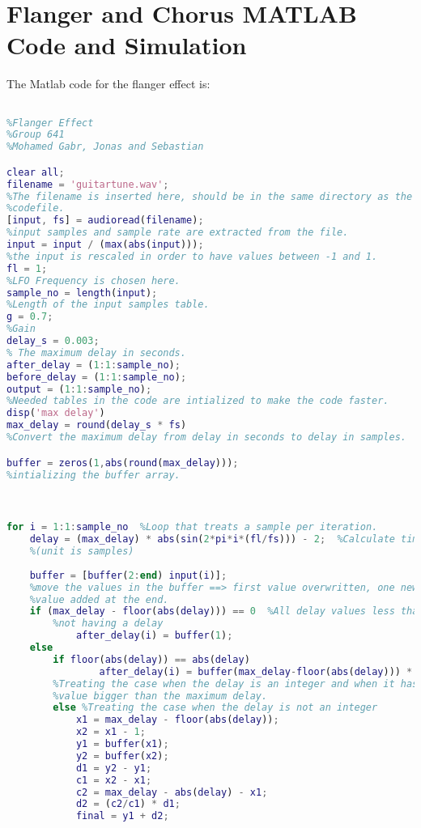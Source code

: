 \chapter{Flanger and Chorus MATLAB Code and Simulation}

The Matlab code for the flanger effect is:

\begin{lstlisting}[language=Matlab, caption= Matlab code for flanger effect]

%Flanger Effect
%Group 641
%Mohamed Gabr, Jonas and Sebastian

clear all;
filename = 'guitartune.wav'; 
%The filename is inserted here, should be in the same directory as the
%codefile.
[input, fs] = audioread(filename);
%input samples and sample rate are extracted from the file.
input = input / (max(abs(input)));
%the input is rescaled in order to have values between -1 and 1. 
fl = 1;  
%LFO Frequency is chosen here.
sample_no = length(input); 
%Length of the input samples table.
g = 0.7; 
%Gain
delay_s = 0.003; 
% The maximum delay in seconds.
after_delay = (1:1:sample_no); 
before_delay = (1:1:sample_no);
output = (1:1:sample_no);
%Needed tables in the code are intialized to make the code faster.
disp('max delay')
max_delay = round(delay_s * fs)  
%Convert the maximum delay from delay in seconds to delay in samples.

buffer = zeros(1,abs(round(max_delay))); 
%intializing the buffer array.



for i = 1:1:sample_no  %Loop that treats a sample per iteration. 
	delay = (max_delay) * abs(sin(2*pi*i*(fl/fs))) - 2;  %Calculate time varying delay 
	%(unit is samples)
	
	buffer = [buffer(2:end) input(i)]; 
	%move the values in the buffer ==> first value overwritten, one new 
	%value added at the end.
	if (max_delay - floor(abs(delay))) == 0  %All delay values less than zero are considered as
	    %not having a delay
	        after_delay(i) = buffer(1);
	else
	    if floor(abs(delay)) == abs(delay)
	            after_delay(i) = buffer(max_delay-floor(abs(delay))) * g;
	    %Treating the case when the delay is an integer and when it has a
	    %value bigger than the maximum delay. 
	    else %Treating the case when the delay is not an integer
	        x1 = max_delay - floor(abs(delay));
	        x2 = x1 - 1;
	        y1 = buffer(x1);
	        y2 = buffer(x2);
	        d1 = y2 - y1;
	        c1 = x2 - x1;
	        c2 = max_delay - abs(delay) - x1;
	        d2 = (c2/c1) * d1;
	        final = y1 + d2;
	

\end{lstlisting}
